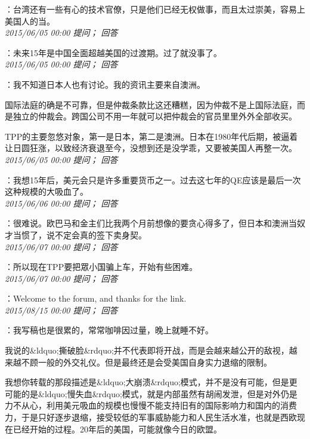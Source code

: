 \documentclass[twocolumn]{ctexart}
\begin{document}
：台湾还有一些有心的技术官僚，只是他们已经无权做事，而且太过崇美，容易上美国人的当。\\

\textit{\hfill\noindent\small 2015/06/05 00:00 提问； 回答}

：未来15年是中国全面超越美国的过渡期。过了就没事了。\\

\textit{\hfill\noindent\small 2015/06/05 00:00 提问； 回答}

：我不知道日本人也有讨论。我的资讯主要来自澳洲。

国际法庭的确是不可靠，但是仲裁条款比这还糟糕，因为仲裁不是上国际法庭，而是独立的仲裁会。跨国公司不用一年就可以把仲裁会的官员里里外外全部收买。

TPP的主要忽悠对象，第一是日本，第二是澳洲。日本在1980年代后期，被逼着让日圆狂涨，以致经济衰退至今，没想到还是没学乖，又要被美国人再整一次。\\

\textit{\hfill\noindent\small 2015/06/05 00:00 提问； 回答}

：我想15年后，美元会只是许多重要货币之一。过去这七年的QE应该是最后一次这种规模的大吸血了。\\

\textit{\hfill\noindent\small 2015/06/06 00:00 提问； 回答}

：很难说。欧巴马和金主们比我两个月前想像的要贪心得多了，但日本和澳洲当奴才当惯了，说不定会真的签下卖身契。\\

\textit{\hfill\noindent\small 2015/06/07 00:00 提问； 回答}

：所以现在TPP要把眾小国骗上车，开始有些困难。\\

\textit{\hfill\noindent\small 2015/06/07 00:00 提问； 回答}

：Welcome to the forum, and thanks for the link.\\

\textit{\hfill\noindent\small 2015/08/15 00:00 提问； 回答}

：我写稿也是很累的，常常咖啡因过量，晚上就睡不好。

我说的\&ldquo;撕破脸\&rdquo;并不代表即将开战，而是会越来越公开的敌视，越来越不顾一般的外交礼仪。但是最终还是会受美国自身实力退缩的限制。

我想你转载的那段描述是\&ldquo;大崩溃\&rdquo;模式，并不是没有可能，但是更可能的是\&ldquo;慢失血\&rdquo;模式，就是内部虽然有胡闹发泄，但是对外仍是力不从心，利用美元吸血的规模也慢慢不能支持旧有的国际影响力和国内的消费力，于是只好逐步退缩，接受较低的军事威胁能力和人民生活水准，也就是西欧现在已经开始的过程。20年后的美国，可能就像今日的欧盟。\\
\end{document}
